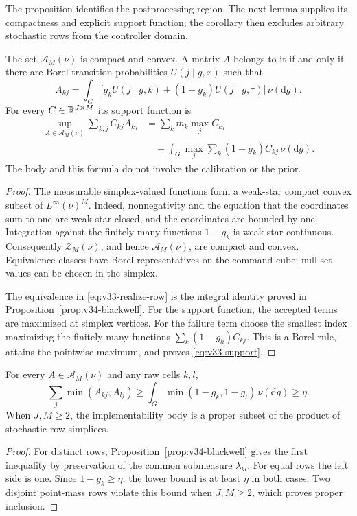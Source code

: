 The proposition identifies the postprocessing region. The next lemma
supplies its compactness and explicit support function; the corollary
then excludes arbitrary stochastic rows from the controller domain.

\begin{lemma}\label{lem:v33-body}
The set $\mathscr A_M(\nu)$ is compact and convex. A matrix $A$ belongs
to it if and only if there are Borel transition probabilities
$U(j\mid g,x)$ such that
\begin{equation}\label{eq:v33-realize-row}
 A_{kj}=\int_G\bigl[g_k U(j\mid g,k)
                 +(1-g_k)U(j\mid g,\dagger)\bigr]\,\nu(\mathrm dg).
\end{equation}
For every $C\in\mathbb R^{J\times M}$ its support function is
\begin{equation}\label{eq:v33-support}
 \begin{split}
 \sup_{A\in\mathscr A_M(\nu)}\sum_{k,j}C_{kj}A_{kj}
 &=\sum_k m_k\max_j C_{kj}\\
 &\quad+\int_G\max_j\sum_k(1-g_k)C_{kj}\,\nu(\mathrm dg).
 \end{split}
\end{equation}
The body and this formula do not involve the calibration or the prior.
\end{lemma}
\begin{proof}
The measurable simplex-valued functions form a weak-star compact convex
subset of $L^\infty(\nu)^M$. Indeed, nonnegativity and the equation that
the coordinates sum to one are weak-star closed, and the coordinates
are bounded by one. Integration against the finitely many functions
$1-g_k$ is weak-star continuous. Consequently $\mathscr Z_M(\nu)$,
and hence $\mathscr A_M(\nu)$, are compact and convex. Equivalence
classes have Borel representatives on the command cube; null-set
values can be chosen in the simplex.

The equivalence in \eqref{eq:v33-realize-row} is the integral
identity proved in Proposition~\ref{prop:v34-blackwell}. For the
support function, the accepted terms are maximized
at simplex vertices. For the failure term choose the smallest index
maximizing the finitely many functions
$\sum_k(1-g_k)C_{kj}$. This is a Borel rule, attains the pointwise
maximum, and proves \eqref{eq:v33-support}.
\end{proof}

\begin{corollary}
\label{cor:v33-overlap}
For every $A\in\mathscr A_M(\nu)$ and any raw cells $k,l$,
\[
 \sum_j\min(A_{kj},A_{lj})
 \ge\int_G\min(1-g_k,1-g_l)\,\nu(\mathrm dg)\ge\eta.
\]
When $J,M\ge2$, the implementability body is a proper subset of the
product of stochastic row simplices.
\end{corollary}
\begin{proof}
For distinct rows, Proposition~\ref{prop:v34-blackwell} gives the
first inequality by preservation of the common submeasure
$\lambda_{kl}$. For equal rows the left side is one. Since
$1-g_k\ge\eta$, the lower bound is at least $\eta$ in both cases.
Two disjoint point-mass rows violate this bound when $J,M\ge2$,
which proves proper inclusion.
\end{proof}

